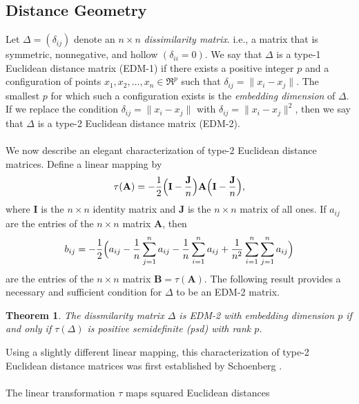 \documentclass[10pt,twocolumn]{article}
\newtheorem{theorem}{Theorem}
\numberwithin{equation}{section}
\begin{document}
\subsection{Distance Geometry}
\label{sec:distance-geometry}
Let $\Delta = (\delta_{ij})$ denote an $n \times n$
{\em dissimilarity matrix}.
i.e., a matrix that is symmetric, nonnegative, and hollow
$(\delta_{ii}=0)$.
We say that $\Delta$ 
is a type-1 Euclidean distance matrix ({EDM-1}) if
there exists a positive integer $p$ and a configuration of points
$x_1,x_2,\dots, x_n \in \Re^p$ such that $\delta_{ij} = \| x_i - x_j
\|$. The smallest $p$ for which such a configuration exists
is the {\em embedding dimension}\/ of $\Delta$. 
If we replace the condition $\delta_{ij} = \| x_i - x_j \|$
with $\delta_{ij} = \| x_i - x_j\|^{2}$,
then we say that $\Delta$ is a type-2
Euclidean distance matrix (EDM-2). \\ \\
%
\noindent
We now describe an elegant characterization
of type-2 Euclidean distance matrices.
Define a linear mapping by
\begin{equation}
  \label{eq:1}
  \tau(\mathbf{A}) = -\frac{1}{2} \Bigl(\mathbf{I} -
  \frac{\mathbf{J}}{n}\Bigr) \mathbf{A} \Bigl(\mathbf{I} -
  \frac{\mathbf{J}}{n} \Bigr),
\end{equation}
where 
$\mathbf{I}$ is the $n \times n$ identity matrix and
$\mathbf{J}$ is the $n \times n$ matrix of all ones.  
If $a_{ij}$ are the entries of the $n \times n$ matrix
$\mathbf{A}$, then
\begin{equation*}
  b_{ij} = -\frac{1}{2}\Bigl(a_{ij} - \frac{1}{n}\sum_{j=1}^{n}a_{ij} -
  \frac{1}{n}\sum_{i=1}^{n}{a_{ij}} +
  \frac{1}{n^2}\sum_{i=1}^{n}\sum_{j=1}^{n}a_{ij}\Bigr)
\end{equation*}
are the entries of the $n \times n$ matrix
$\mathbf{B} = \tau(\mathbf{A})$. The following
result provides a necessary and
sufficient condition for $\Delta$ to be an EDM-2 matrix.
\begin{theorem}
  \label{thm:1}
  The dissmilarity matrix 
$\Delta$ is EDM-2 with embedding dimension $p$ if and only
  if $\tau(\Delta)$ is positive semidefinite (psd) with rank
  $p$. 
\end{theorem}
Using a slightly different linear mapping,
this characterization of type-2 Euclidean distance matrices
was first established by Schoenberg
\cite{schoenberg35:_remar_mauric_frech_sur_hilber}. \\ \\
%
\noindent
The linear transformation $\tau$ maps squared Euclidean distances
\end{document}
